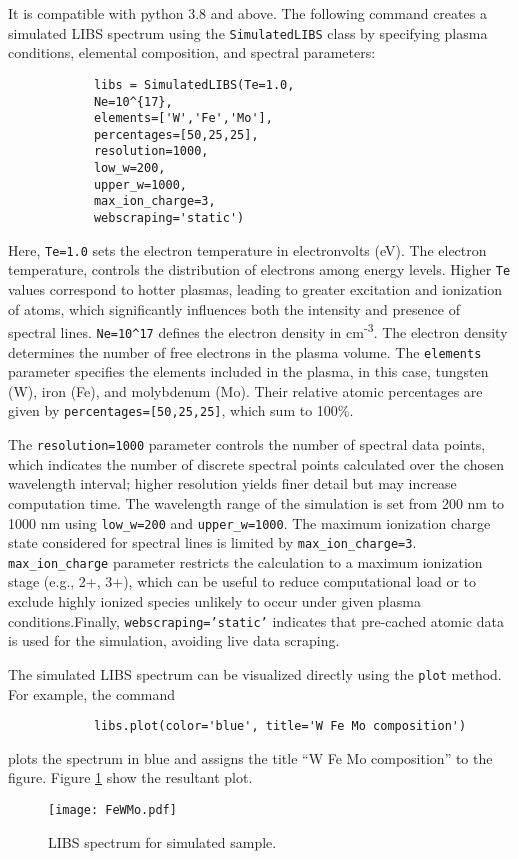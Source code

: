 \documentclass[12pt,a4paper]{article}
\begin{document}
		It is compatible with python 3.8 and above. The following command creates a simulated LIBS spectrum using the \texttt{SimulatedLIBS} class by specifying plasma conditions, elemental composition, and spectral parameters:
		\vspace{-0.5em}
		\begin{verbatim}
			libs = SimulatedLIBS(Te=1.0,
			Ne=10^{17},
			elements=['W','Fe','Mo'],
			percentages=[50,25,25],
			resolution=1000,
			low_w=200,
			upper_w=1000,
			max_ion_charge=3,
			webscraping='static')
		\end{verbatim}
		\vspace{-1.5em}
		
		Here, \texttt{Te=1.0} sets the electron temperature in electronvolts (eV). The electron temperature, controls the distribution of electrons among energy levels. Higher \texttt{Te} values correspond to hotter plasmas, leading to greater excitation and ionization of atoms, which significantly influences both the intensity and presence of spectral lines. \texttt{Ne=10\textasciicircum17} defines the electron density in cm\textsuperscript{-3}. The electron density  determines the number of free electrons in the plasma volume. The \texttt{elements} parameter specifies the elements included in the plasma, in this case, tungsten (W), iron (Fe), and molybdenum (Mo). Their relative atomic percentages are given by \texttt{percentages=[50,25,25]}, which sum to 100\%.
		
		The \texttt{resolution=1000} parameter controls the number of spectral data points, which indicates the number of discrete spectral points calculated over the chosen wavelength interval; higher resolution yields finer detail but may increase computation time. The wavelength range of the simulation is set from 200 nm to 1000 nm using \texttt{low\_w=200} and \texttt{upper\_w=1000}. The maximum ionization charge state considered for spectral lines is limited by \texttt{max\_ion\_charge=3}. \texttt{max\_ion\_charge} parameter restricts the calculation to a maximum ionization stage (e.g., 2+, 3+), which can be useful to reduce computational load or to exclude highly ionized species unlikely to occur under given plasma conditions.Finally, \texttt{webscraping='static'} indicates that pre-cached atomic data is used for the simulation, avoiding live data scraping.
		
		The simulated LIBS spectrum can be visualized directly using the \texttt{plot} method. For example, the command
		
		\vspace{-0.5em}
		\begin{verbatim}
			libs.plot(color='blue', title='W Fe Mo composition')
		\end{verbatim}
		\vspace{-1.5em}
		plots the spectrum in blue and assigns the title ``W Fe Mo composition'' to the figure. Figure \ref*{fig:libs-spectrum-FeWMo} show the resultant plot.
		\begin{figure}[h!]
			\centering
			\texttt{[image: FeWMo.pdf]}
			\caption{LIBS spectrum for simulated sample.}
			\label{fig:libs-spectrum-FeWMo}
		\end{figure}
		
\end{document}
